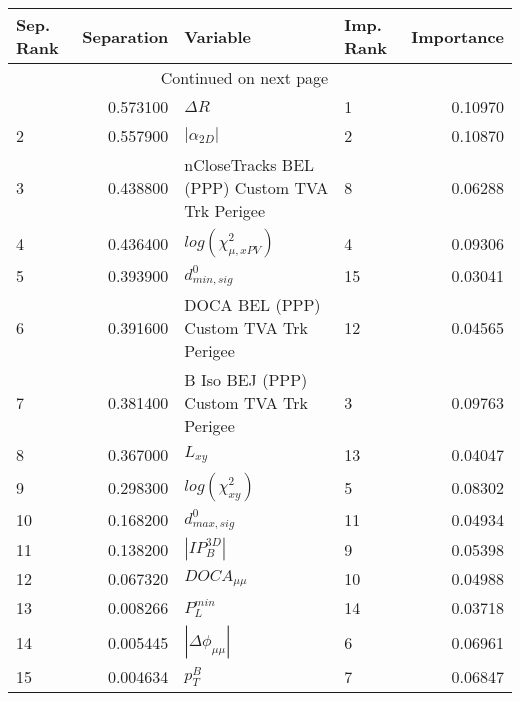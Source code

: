 \usepackage{lscape}

\begin{landscape}
\begin{longtable}{lrllr}
\toprule
Sep. Rank &  Separation &                                       Variable & Imp. Rank &  Importance \\
\midrule
\endhead
\midrule
\multicolumn{3}{r}{{Continued on next page}} \\
\midrule
\endfoot

\bottomrule
\endlastfoot
        1 &    0.573100 &                                     $\Delta R$ &         1 &     0.10970 \\
        2 &    0.557900 &                                $|\alpha_{2D}|$ &         2 &     0.10870 \\
        3 &    0.438800 &  nCloseTracks BEL (PPP) Custom TVA Trk Perigee &         8 &     0.06288 \\
        4 &    0.436400 &                      $log(\chi^{2}_{\mu,xPV})$ &         4 &     0.09306 \\
        5 &    0.393900 &                               $d^0_{min, sig}$ &        15 &     0.03041 \\
        6 &    0.391600 &          DOCA BEL (PPP) Custom TVA Trk Perigee &        12 &     0.04565 \\
        7 &    0.381400 &         B Iso BEJ (PPP) Custom TVA Trk Perigee &         3 &     0.09763 \\
        8 &    0.367000 &                                       $L_{xy}$ &        13 &     0.04047 \\
        9 &    0.298300 &                           $log(\chi^{2}_{xy})$ &         5 &     0.08302 \\
       10 &    0.168200 &                               $d^0_{max, sig}$ &        11 &     0.04934 \\
       11 &    0.138200 &                                $|IP_{B}^{3D}|$ &         9 &     0.05398 \\
       12 &    0.067320 &                                $DOCA_{\mu\mu}$ &        10 &     0.04988 \\
       13 &    0.008266 &                                  $P^{min}_{L}$ &        14 &     0.03718 \\
       14 &    0.005445 &                       $|\Delta \phi_{\mu\mu}|$ &         6 &     0.06961 \\
       15 &    0.004634 &                                      $p^B_{T}$ &         7 &     0.06847 \\
\end{longtable}

\end{landscape}

